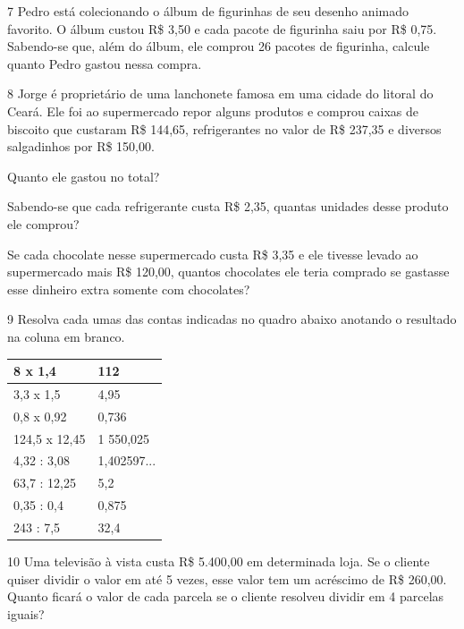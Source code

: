 \num{7} Pedro está colecionando o álbum de figurinhas de seu desenho
animado favorito. O álbum custou R\$ 3,50 e cada pacote de figurinha
saiu por R\$ 0,75. Sabendo-se que, além do álbum, ele comprou 26 pacotes
de figurinha, calcule quanto Pedro gastou nessa compra.

\begin{emptybox}
\bigskip
\bigskip
\bigskip
\bigskip
\bigskip
\end{emptybox}

\pagebreak
\num{8} Jorge é proprietário de uma lanchonete famosa em uma cidade do
litoral do Ceará. Ele foi ao supermercado repor alguns produtos e
comprou caixas de biscoito que custaram R\$ 144,65, refrigerantes no
valor de R\$ 237,35 e diversos salgadinhos por R\$ 150,00.

\begin{escolha}
\item
  Quanto ele gastou no total?

\bigskip

\item
  Sabendo-se que cada refrigerante custa R\$ 2,35, quantas unidades
  desse produto ele comprou?

\bigskip

\item
  Se cada chocolate nesse supermercado custa R\$ 3,35 e ele tivesse
  levado ao supermercado mais R\$ 120,00, quantos chocolates ele teria
  comprado se gastasse esse dinheiro extra somente com chocolates?

\bigskip
\end{escolha}


\num{9} Resolva cada umas das contas indicadas no quadro abaixo anotando o
resultado na coluna em branco.

\begin{longtable}[]{@{}ll@{}}
\toprule
8 x 1,4 & 112\tabularnewline
\midrule
\endhead
3,3 x 1,5 & 4,95\tabularnewline
0,8 x 0,92 & 0,736\tabularnewline
124,5 x 12,45 & 1 550,025\tabularnewline
4,32 : 3,08 & 1,402597...\tabularnewline
63,7 : 12,25 & 5,2\tabularnewline
0,35 : 0,4 & 0,875\tabularnewline
243 : 7,5 & 32,4\tabularnewline
\bottomrule
\end{longtable}

\num{10} Uma televisão à vista custa R\$ 5.400,00 em determinada loja.
Se o cliente quiser dividir o valor em até 5 vezes, esse valor tem um
acréscimo de R\$ 260,00. Quanto ficará o valor de cada parcela se o
cliente resolveu dividir em 4 parcelas iguais?

